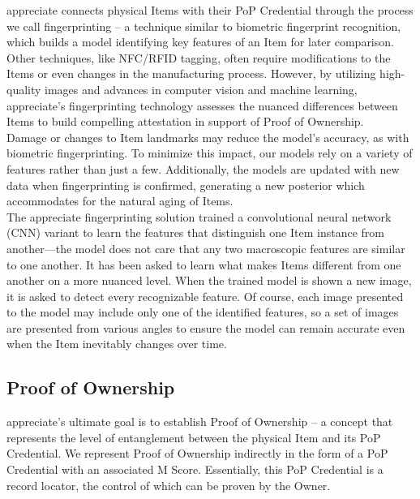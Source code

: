 \documentclass[a4paper,onecolumn, 10.5pt]{article}
\begin{document}
\begin{tcolorbox}[colback=gray!5!white,colframe=gray!50!black, title=M score components: item fingerprinting]

appreciate connects physical Items with their PoP Credential through the process we call fingerprinting – a technique similar to biometric fingerprint recognition, which builds a model identifying key features of an Item for later comparison. Other techniques, like NFC/RFID tagging, often require modifications to the Items or even changes in the manufacturing process. However, by utilizing high-quality images and advances in computer vision and machine learning, appreciate’s fingerprinting technology assesses the nuanced differences between Items to build compelling attestation in support of Proof of Ownership.\\
\newline
Damage or changes to Item landmarks may reduce the model’s accuracy, as with biometric fingerprinting. To minimize this impact, our models rely on a variety of features rather than just a few. Additionally, the models are updated with new data when fingerprinting is confirmed, generating a new posterior which accommodates for the natural aging of Items.\\
\newline
The appreciate fingerprinting solution trained a convolutional neural network (CNN) variant to learn the features that distinguish one Item instance from another—the model does not care that any two macroscopic features are similar to one another. It has been asked to learn what makes Items different from one another on a more nuanced level. When the trained model is shown a new image, it is asked to detect every recognizable feature. Of course, each image presented to the model may include only one of the identified features, so a set of images are presented from various angles to ensure the model can remain accurate even when the Item inevitably changes over time.
\end{tcolorbox}



\subsection {Proof of Ownership}

appreciate’s ultimate goal is to establish Proof of Ownership -- a concept that represents the level of entanglement between the physical Item and its PoP Credential.  We represent Proof of Ownership indirectly in the form of a PoP Credential with an associated M Score. Essentially, this PoP Credential is a record locator, the control of which can be proven by the Owner.
\end{document}

